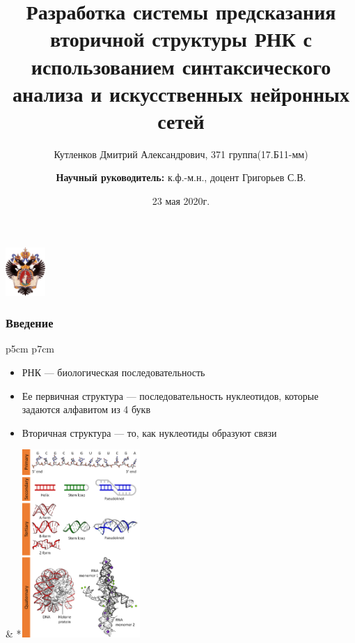 \documentclass{beamer}
\title[]{Разработка системы предсказания вторичной структуры РНК с использованием синтаксического анализа и искусственных нейронных сетей}
\institute[СПбГУ]{
Санкт-Петербургский государственный университет \\
Кафедра системного программирования }
\author[Кутленков Дмитрий]{Кутленков Дмитрий Александрович, 371 группа(17.Б11-мм) \\
  \and  
    {\bfseries Научный руководитель:} к.ф.-м.н., доцент Григорьев С.В. \\ 
}
\date{23 мая 2020г.}
\begin{document}
{
\begin{frame}
  \begin{center}
  {\includegraphics[width=1.5cm]{pictures/SPbGU_Logo.png}}
  \end{center}
  \titlepage
\end{frame}
}

\begin{frame}[fragile]
  \transwipe[direction=90]
  \frametitle{Введение}
  
\begin{tabular}{p{5cm} p{7cm}}
	\begin{itemize}
		\item РНК --- биологическая последовательность
		\item Ее первичная структура --- последовательность нуклеотидов, которые задаются алфавитом из 4 букв
		\item Вторичная структура --- то, как нуклеотиды образуют связи
  \end{itemize} &
*{\!\includegraphics[width=4.5cm]{../pics/DNA_RNA_structure_(full).png}}
\end{tabular}

\end{frame}
            
\end{document}
